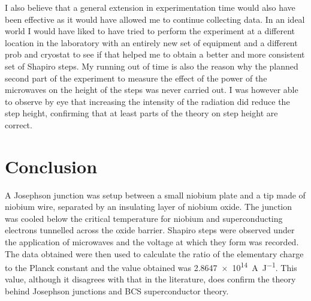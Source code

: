 \documentclass[11pt]{article}
\begin{document}
I also believe that a general extension in experimentation time would also have been effective as it would have allowed me to continue collecting data. In an ideal world I would have liked to have tried to perform the experiment at a different location in the laboratory with an entirely new set of equipment and a different prob and cryostat to see if that helped me to obtain a better and more consistent set of Shapiro steps. My running out of time is also the reason why the planned second part of the experiment to measure the effect of the power of the microwaves on the height of the steps was never carried out. I was however able to observe by eye that increasing the intensity of the radiation did reduce the step height, confirming that at least parts of the theory on step height are correct.

\section{Conclusion}
A Josephson junction was setup between a small niobium plate and a tip made of niobium wire, separated by an insulating layer of niobium oxide. The junction was cooled below the critical temperature for niobium and superconducting electrons tunnelled across the oxide barrier. Shapiro steps were observed under the application of microwaves and the voltage at which they form was recorded. The data obtained were then used to calculate the ratio of the elementary charge to the Planck constant and the value obtained was \SI{2.8647e14}{\ampere\per\joule}. This value, although it disagrees with that in the literature, does confirm the theory behind Josephson junctions and BCS superconductor theory.



\end{document}
